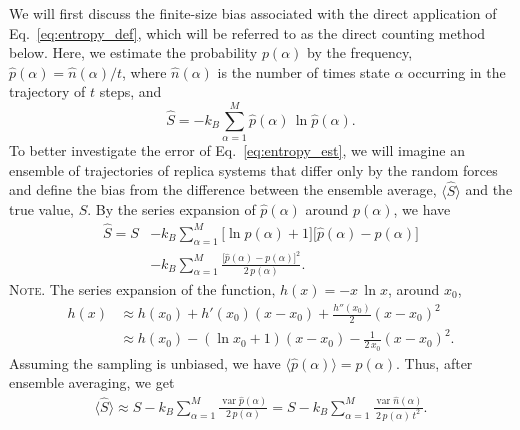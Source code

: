 \documentclass[preprint, superscriptaddress]{revtex4-1}
\newcommand{\note}[1]{{\color{DarkGreen}\footnotesize \textsc{Note.} #1}}
\begin{document}
We will first discuss the finite-size bias associated with
the direct application of Eq.~\eqref{eq:entropy_def},
which will be referred to as the direct counting method below.
%
Here, we estimate the probability $p(\alpha)$
by the frequency, $\hat{p}(\alpha) = \hat{n}(\alpha) / t$,
where $\hat{n}(\alpha)$ is the number of times state $\alpha$ occurring in the trajectory of $t$ steps,
and
%
\begin{equation}
  \hat S
  =
  -k_B \sum_{\alpha = 1}^M \hat{p}(\alpha) \, \ln \hat{p}(\alpha)
  .
  \label{eq:entropy_est}
\end{equation}
%
To better investigate the error of Eq.~\eqref{eq:entropy_est},
we will imagine an ensemble of trajectories of replica systems
that differ only by the random forces
and define the bias from the difference
between the ensemble average,
$\bigl\langle \hat S \bigr\rangle$
and the true value, $S$.
%
By the series expansion of $\hat{p}(\alpha)$ around $p(\alpha)$, we have
%
\begin{align*}
  \hat S
  =
  S
  &- k_B \sum_{\alpha = 1}^M
    \bigl[\ln p(\alpha) + 1 \bigr]
    \bigl[ \hat{p}(\alpha) - p(\alpha) \bigr]
  \\
  &- k_B \sum_{\alpha = 1}^M
    \frac{ \bigl[ \hat{p}(\alpha) - p(\alpha) \bigr]^2 } { 2 \, p(\alpha) }
  .
\end{align*}
%
\note{The series expansion of the function, $h(x) = -x \, \ln x$,
around $x_0$,
%
\begin{align*}
  h(x)
  &\approx h(x_0) + h'(x_0) (x - x_0) + \frac{h''(x_0)}{2} (x - x_0)^2 \\
  &\approx h(x_0) - (\ln x_0 + 1) ( x - x_0) - \frac{1}{2 \, x_0} (x - x_0)^2
  .
\end{align*}
}
%
Assuming the sampling is unbiased,
we have $\langle \hat{p}(\alpha) \rangle = p(\alpha)$.
%
Thus, after ensemble averaging, we get
%
\begin{align}
  \bigl\langle \hat S \bigr\rangle
  \approx
  S - k_B \sum_{\alpha = 1}^M
    \frac{ \operatorname{var} \hat{p}(\alpha) } { 2 \, p(\alpha) }
  =
  S - k_B \sum_{\alpha = 1}^M
    \frac{ \operatorname{var} \hat{n}(\alpha) } { 2 \, p(\alpha) \, t^2 }
  .
  \label{eq:entest_2nd}
\end{align}
\end{document}

